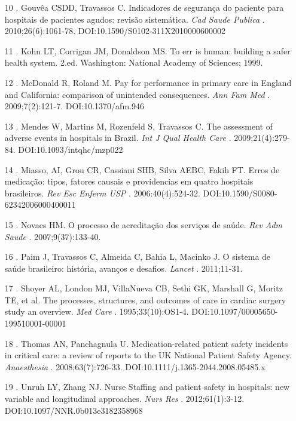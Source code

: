 \documentclass{article}
\begin{document}
\begin{itemize}
\item[10] . Gouvêa CSDD, Travassos C. Indicadores de segurança do paciente para
hospitais de pacientes agudos: revisão sistemática. \textit{Cad Saude Publica}
.
2010;26(6):1061-78. DOI:10.1590/S0102-311X2010000600002

\item[11] . Kohn LT, Corrigan JM, Donaldson MS. To err is human: building a
safer
health system. 2.ed. Washington: National Academy of Sciences; 1999.

\item[12] . McDonald R, Roland M. Pay for performance in primary care in England
and
California: comparison of unintended consequences. \textit{Ann Fam Med}
.
2009;7(2):121-7. DOI:10.1370/afm.946

\item[13] . Mendes W, Martins M, Rozenfeld S, Travassos C. The assessment of
adverse
events in hospitals in Brazil. \textit{Int J Qual Health Care}
.
2009;21(4):279-84. DOI:10.1093/intqhc/mzp022

\item[14] . Miasso, AI, Grou CR, Cassiani SHB, Silva AEBC, Fakih FT. Erros de
medicação: tipos, fatores causais e providencias em quatro hospitais
brasileiros.
\textit{Rev Esc Enferm USP}
. 2006:40(4):524-32.
DOI:10.1590/S0080-62342006000400011

\item[15] . Novaes HM. O processo de acreditação dos serviços de saúde.
\textit{Rev
Adm Saude}
. 2007;9(37):133-40.

\item[16] . Paim J, Travassos C, Almeida C, Bahia L, Macinko J. O sistema de
saúde
brasileiro: história, avanços e desafios. \textit{Lancet}
.
2011;11-31.

\item[17] . Shoyer AL, London MJ, VillaNueva CB, Sethi GK, Marshall G, Moritz
TE, et
al. The processes, structures, and outcomes of care in cardiac surgery study an
overview.
\textit{Med Care}
. 1995;33(10):OS1-4.
DOI:10.1097/00005650-199510001-00001

\item[18] . Thomas AN, Panchagnula U. Medication-related patient safety
incidents in
critical care: a review of reports to the UK National Patient Safety Agency.
\textit{Anaesthesia}
. 2008;63(7):726-33.
DOI:10.1111/j.1365-2044.2008.05485.x

\item[19] . Unruh LY, Zhang NJ. Nurse Staffing and patient safety in hospitals:
new
variable and longitudinal approaches. \textit{Nurs Res}
. 2012;61(1):3-12.
DOI:10.1097/NNR.0b013e3182358968


\end{itemize}
\end{document}
